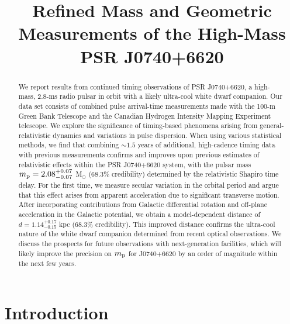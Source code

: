 \documentclass[twocolumn]{aastex63}
\begin{document}
\title{Refined Mass and Geometric Measurements of the High-Mass PSR J0740+6620}




\begin{abstract}
We report results from continued timing observations of PSR J0740+6620, a high-mass, 2.8-ms radio pulsar in orbit with a likely ultra-cool white dwarf companion. Our data set consists of combined pulse arrival-time measurements made with the 100-m Green Bank Telescope and the Canadian Hydrogen Intensity Mapping Experiment telescope. We explore the significance of timing-based phenomena arising from general-relativistic dynamics and variations in pulse dispersion. When using various statistical methods, we find that combining $\sim 1.5$ years of additional, high-cadence timing data with previous measurements confirms and improves upon previous estimates of relativistic effects within the PSR J0740+6620 system, with the pulsar mass $m_{\rm p} = 2.08^{+0.07}_{-0.07}$ M$_\odot$ (68.3\% credibility) determined by the relativistic Shapiro time delay. For the first time, we measure secular variation in the orbital period and argue that this effect arises from apparent acceleration due to significant transverse motion. After incorporating contributions from Galactic differential rotation and off-plane acceleration in the Galactic potential, we obtain a model-dependent distance of $d = 1.14^{+0.17}_{-0.15}$ kpc (68.3\% credibility). This improved distance confirms the ultra-cool nature of the white dwarf companion determined from recent optical observations. We discuss the prospects for future observations with next-generation facilities, which will likely improve the precision on $m_{\rm p}$ for J0740+6620 by an order of magnitude within the next few years. 
\end{abstract}



\section{Introduction}
\label{sec:intro}
\end{document}
